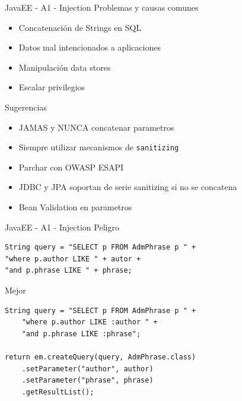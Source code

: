 \documentclass[aspectratio=169]{beamer}
\begin{document}
\begin{frame}{JavaEE - A1 - Injection}
    Problemas y causas comunes
    \begin{itemize}
        \item Concatenación de Strings en SQL
        \item Datos mal intencionados a aplicaciones
        \item Manipulación data stores
        \item Escalar privilegios
    \end{itemize}
    
    Sugerencias
    \begin{itemize}
        \item JAMAS y NUNCA concatenar parametros
        \item Siempre utilizar mecanismos de \texttt{sanitizing}
        \item Parchar con OWASP ESAPI
        \item JDBC y JPA soportan de serie sanitizing si no se concatena
        \item Bean Validation en parametros
    \end{itemize}
\end{frame}


\begin{frame}[fragile]{JavaEE - A1 - Injection}
Peligro
\begin{lstlisting}
String query = "SELECT p FROM AdmPhrase p " +
"where p.author LIKE " + autor +
"and p.phrase LIKE " + phrase;

\end{lstlisting}	

Mejor
\begin{lstlisting}[basicstyle=\scriptsize]
String query = "SELECT p FROM AdmPhrase p " +
    "where p.author LIKE :author " +
    "and p.phrase LIKE :phrase";

return em.createQuery(query, AdmPhrase.class)
    .setParameter("author", author)
    .setParameter("phrase", phrase)
    .getResultList();
\end{lstlisting}
\end{frame}
\end{document}
